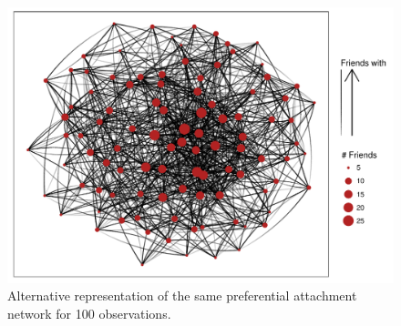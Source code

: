 \documentclass[english]{article}\usepackage[]{graphicx}\usepackage[]{color}
\makeatletter
\def\maxwidth{ %
  \ifdim\Gin@nat@width>\linewidth
    \linewidth
  \else
    \Gin@nat@width
  \fi
}
\newenvironment{kframe}{%
 \def\at@end@of@kframe{}%
 \ifinner\ifhmode%
  \def\at@end@of@kframe{\end{minipage}}%
  \begin{minipage}{\columnwidth}%
 \fi\fi%
 \def\FrameCommand##1{\hskip\@totalleftmargin \hskip-\fboxsep
 \colorbox{shadecolor}{##1}\hskip-\fboxsep
     \hskip-\linewidth \hskip-\@totalleftmargin \hskip\columnwidth}%
 \MakeFramed {\advance\hsize-\width
   \@totalleftmargin\z@ \linewidth\hsize
   \@setminipage}}%
 {\par\unskip\endMakeFramed%
 \at@end@of@kframe}
\newenvironment{knitrout}{}{} %
\theoremstyle{plain}
\theoremstyle{plain}
\makeatother
\begin{document}
\begin{knitrout}\footnotesize
{}\color{fgcolor}\begin{kframe}


{\ttfamily\noindent\color{warningcolor}{\#\# Warning: package 'bindrcpp' was built under R version 3.3.2}}\end{kframe}\begin{figure}[ht]

{\centering \includegraphics[width=\maxwidth]{TablesFigs/knitR-unnamed-chunk-13-1} 

}

\caption{Alternative representation of the same preferential attachment network for 100 observations.\label{fig:netExamplePA2}}\label{fig:unnamed-chunk-13}
\end{figure}


\end{knitrout}
\end{document}
